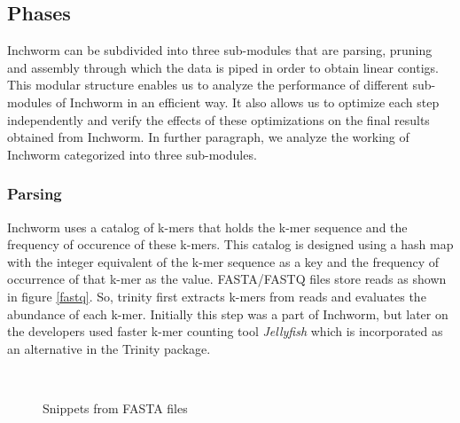 \label{key}\documentclass[plainarticle, english ,zihtitle,final,hyperref,utf8]{zihpub}
\begin{document}
\subsection{Phases}
Inchworm can be subdivided into three sub-modules that  are parsing, pruning and assembly through which the data is piped in order to obtain linear contigs. This modular structure enables us to analyze the performance of different sub-modules of Inchworm in an efficient way. It also allows us to optimize each step independently and verify the effects of these optimizations on the final results obtained from Inchworm. In further paragraph, we analyze the working of Inchworm categorized into three sub-modules.  
\subsubsection{Parsing}
Inchworm uses a catalog of k-mers that holds the k-mer sequence and the frequency of occurence of these k-mers. This catalog is designed using a hash map with the integer equivalent of the k-mer sequence as a key and the frequency of occurrence of that k-mer as the value. FASTA/FASTQ files store reads as shown in figure \ref{fastq}. So, trinity first extracts k-mers  from reads and evaluates the abundance of each k-mer. Initially this step was a part of Inchworm, but  later on the developers used faster k-mer counting tool  \emph{Jellyfish} which is incorporated as an alternative in the Trinity package.
\begin{figure}[h]
\begin{center}
\\
\caption{Snippets from FASTA files}
\end{center}
\end{figure}
\end{document}

